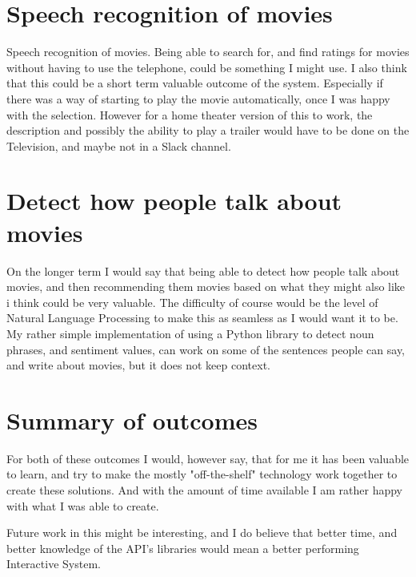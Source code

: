 \documentclass[11pt,fleqn]{book} %
\begin{document}
\section{Speech recognition of movies}
Speech recognition of movies. Being able to search for, and find ratings for movies without having to use the telephone, could be something I might use.
I also think that this could be a short term valuable outcome of the system. Especially if there was a way of starting to play the movie automatically, once I was happy with the selection. However for a home theater version of this to work, the description and possibly the ability to play a trailer would have to be done on the Television, and maybe not in a Slack channel.

\section{Detect how people talk about movies}
On the longer term I would say that being able to detect how people talk about movies, and then recommending them movies based on what they might also like i think could be very valuable. The difficulty of course would be the level of Natural Language Processing\cite{Wikipedia2017NaturalProcessing} to make this as seamless as I would want it to be. 
My rather simple implementation of using a Python library \cite{TextBlobTutorial:Documentation} to detect noun phrases, and sentiment values, can work on some of the sentences people can say, and write about movies, but it does not keep context. 
\section{Summary of outcomes}
For both of these outcomes I would, however say, that for me it has been valuable to learn, and try to make the mostly "off-the-shelf" technology work together to create these solutions. And with the amount of time available I am rather happy with what I was able to create.

Future work in this might be interesting, and I do believe that better time, and better knowledge of the API's libraries would mean a better performing Interactive System.

\printbibliography

\end{document}
